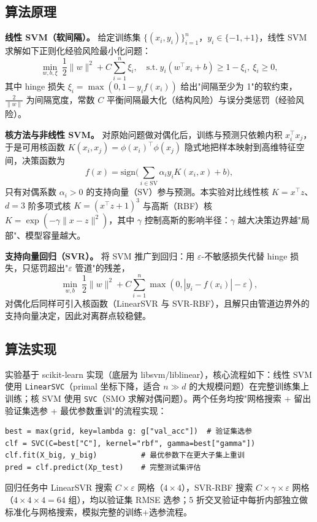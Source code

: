 \documentclass[UTF8,zihao=-4]{ctexart}
\begin{document}
\subsection{算法原理}
\textbf{线性 SVM（软间隔）。} 给定训练集 $\{(x_i,y_i)\}_{i=1}^n$，$y_i\in\{-1,+1\}$，线性 SVM 求解如下正则化经验风险最小化问题：
\[
  \min_{w,b,\xi}\ \frac{1}{2}\|w\|^2 + C\sum_{i=1}^{n}\xi_i,\quad
  \text{s.t.}\ y_i(w^\top x_i+b)\ge 1-\xi_i,\ \xi_i\ge 0,
\]
其中 hinge 损失 $\xi_i=\max(0,1-y_i f(x_i))$ 给出"间隔至少为 1"的软约束，$\frac{2}{\|w\|}$ 为间隔宽度，常数 $C$ 平衡间隔最大化（结构风险）与误分类惩罚（经验风险）。

\textbf{核方法与非线性 SVM。} 对原始问题做对偶化后，训练与预测只依赖内积 $x_i^\top x_j$，于是可用核函数 $K(x_i,x_j)=\phi(x_i)^\top\phi(x_j)$ 隐式地把样本映射到高维特征空间，决策函数为
\[
  f(x)=\mathrm{sign}\Big(\sum_{i\in\text{SV}} \alpha_i y_i K(x_i,x)+b\Big),
\]
只有对偶系数 $\alpha_i>0$ 的支持向量（SV）参与预测。本实验对比线性核 $K=x^\top z$、$d=3$ 阶多项式核 $K=(x^\top z+1)^3$ 与高斯（RBF）核 $K=\exp(-\gamma\|x-z\|^2)$，其中 $\gamma$ 控制高斯的影响半径：$\gamma$ 越大决策边界越"局部"、模型容量越大。

\textbf{支持向量回归（SVR）。} 将 SVM 推广到回归：用 $\varepsilon$-不敏感损失代替 hinge 损失，只惩罚超出"$\varepsilon$ 管道"的残差，
\[
  \min_{w,b}\ \frac{1}{2}\|w\|^2 + C\sum_{i=1}^{n}\max(0,|y_i-f(x_i)|-\varepsilon),
\]
对偶化后同样可引入核函数（LinearSVR 与 SVR-RBF），且解只由管道边界外的支持向量决定，因此对离群点较稳健。

\subsection{算法实现}
实验基于 scikit-learn 实现（底层为 libsvm/liblinear），核心流程如下：线性 SVM 使用 \texttt{LinearSVC}（primal 坐标下降，适合 $n\gg d$ 的大规模问题）在完整训练集上训练；核 SVM 使用 \texttt{SVC}（SMO 求解对偶问题）。两个任务均按"网格搜索 + 留出验证集选参 + 最优参数重训"的流程实现：

\begin{lstlisting}
best = max(grid, key=lambda g: g["val_acc"])  # 验证集选参
clf = SVC(C=best["C"], kernel="rbf", gamma=best["gamma"])
clf.fit(X_big, y_big)          # 最优参数下在更大子集上重训
pred = clf.predict(Xp_test)    # 完整测试集评估
\end{lstlisting}

回归任务中 LinearSVR 搜索 $C\times\varepsilon$ 网格（$4\times4$），SVR-RBF 搜索 $C\times\gamma\times\varepsilon$ 网格（$4\times4\times4=64$ 组），均以验证集 RMSE 选参；5 折交叉验证中每折内部独立做标准化与网格搜索，模拟完整的训练+选参流程。
\end{document}
